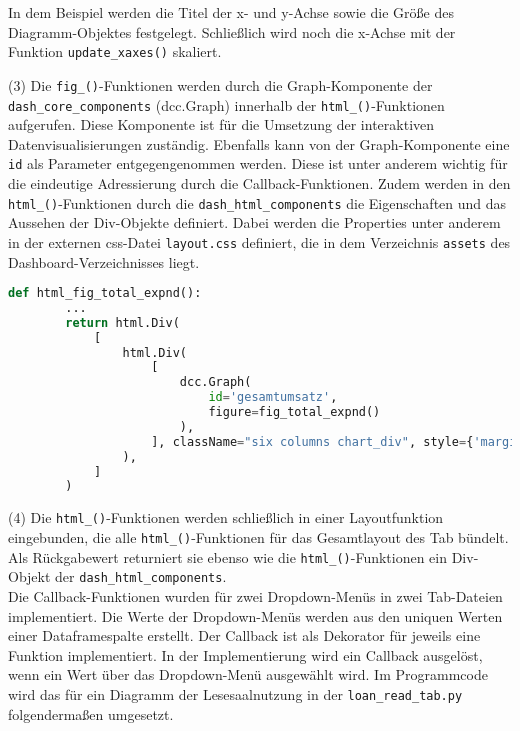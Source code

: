     In dem Beispiel werden die Titel der x- und y-Achse sowie die
    Größe des Diagramm-Objektes festgelegt. Schließlich wird noch die x-Achse mit der Funktion \texttt{update\_xaxes()} skaliert.
    
    (3) Die \texttt{fig\_()}-Funktionen werden durch die Graph-Komponente der \texttt{dash\_core\_components} (dcc.Graph) innerhalb der 
    \texttt{html\_()}-Funktionen aufgerufen. Diese Komponente ist für die Umsetzung der interaktiven Datenvisualisierungen 
    zuständig. Ebenfalls kann von der Graph-Komponente eine \texttt{id} als Parameter entgegengenommen werden. 
    Diese ist unter anderem wichtig für die eindeutige Adressierung durch die Callback-Funktionen.
    Zudem werden in den \texttt{html\_()}-Funktionen durch die \texttt{dash\_html\_components} die Eigenschaften und 
    das Aussehen der Div-Objekte definiert. 
    Dabei werden die Properties unter anderem in der externen css-Datei \texttt{layout.css} definiert, die in dem Verzeichnis \texttt{assets} 
    des Dashboard-Verzeichnisses liegt.

    \begin{lstlisting}[language=Python, caption={html\_fig\_total\_expnd()}] 
        def html_fig_total_expnd():
        ...
        return html.Div(
            [
                html.Div(
                    [
                        dcc.Graph(
                            id='gesamtumsatz',
                            figure=fig_total_expnd()
                        ),
                    ], className="six columns chart_div", style={'margin-top': '20px', 'margin-left': '10px'}
                ),
            ]
        )
        \end{lstlisting}
    
    (4) Die \texttt{html\_()}-Funktionen werden schließlich in einer Layoutfunktion eingebunden, die alle \texttt{html\_()}-Funktionen
    für das Gesamtlayout des Tab bündelt. Als Rückgabewert returniert sie ebenso wie die \texttt{html\_()}-Funktionen ein Div-Objekt der \texttt{dash\_html\_components}.\\



    Die Callback-Funktionen wurden für zwei Dropdown-Menüs in zwei Tab-Dateien implementiert.
    Die Werte der Dropdown-Menüs werden aus den uniquen Werten einer Dataframespalte erstellt.
    Der Callback ist als Dekorator für jeweils eine Funktion implementiert. 
    In der Implementierung wird ein Callback ausgelöst, wenn ein Wert über das Dropdown-Menü ausgewählt wird.
    Im Programmcode wird das für ein Diagramm der Lesesaalnutzung in der \texttt{loan\_read\_tab.py} folgendermaßen umgesetzt.

